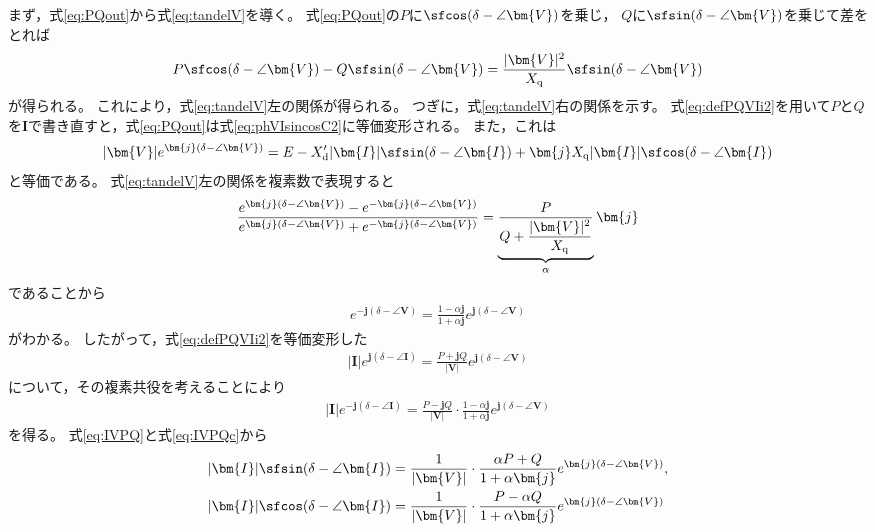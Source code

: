 \documentclass[tombow,dvipdfmx]{corona-a5-1.1}
\begin{document}
\begin{証明}
まず，式\ref{eq:PQout}から式\ref{eq:tandelV}を導く。
式\ref{eq:PQout}の$P$に$\sfcos (\delta - \angle \bm{V})$を乗じ，
$Q$に$\sfsin (\delta - \angle \bm{V})$を乗じて差をとれば
\begin{align*}
P \sfcos (\delta - \angle \bm{V}) - Q \sfsin (\delta - \angle \bm{V})
= \frac{|\bm{V}|^2}{X_{\rm q}} \sfsin (\delta - \angle \bm{V}) 
\end{align*}
が得られる。
これにより，式\ref{eq:tandelV}左の関係が得られる。
つぎに，式\ref{eq:tandelV}右の関係を示す。
式\ref{eq:defPQVIi2}を用いて$P$と$Q$を$\bm{I}$で書き直すと，式\ref{eq:PQout}は式\ref{eq:phVIsincosC2}に等価変形される。
また，これは
\begin{align}\label{eq:tmpVE}
|\bm{V}|e^{\bm{j}(\delta - \angle \bm{V})}=E
-X_{\rm d}' |\bm{I}| \sfsin (\delta - \angle \bm{I})
+ 
\bm{j} X_{\rm q} 
|\bm{I}| \sfcos (\delta - \angle \bm{I})
\end{align}
と等価である。
式\ref{eq:tandelV}左の関係を複素数で表現すると
\begin{align*}
\frac{ e^{\bm{j}(\delta - \angle \bm{V})} - e^{-\bm{j}(\delta - \angle \bm{V})}}
{e^{\bm{j}(\delta - \angle \bm{V})} + e^{-\bm{j}(\delta - \angle \bm{V})}}
= 
\underbrace{
\frac{P}{Q + \frac{ |\bm{V}|^2}{X_{\rm q}} }
}_{\alpha}
 \bm{j}
\end{align*}
であることから
\begin{align*}
e^{-\bm{j}(\delta - \angle \bm{V})} = \frac{1-\alpha \bm{j}}{1+\alpha \bm{j}}
e^{\bm{j}(\delta - \angle \bm{V})}
\end{align*}
がわかる。
したがって，式\ref{eq:defPQVIi2}を等価変形した
\begin{align}\label{eq:IVPQ}
|\bm{I}|e^{\bm{j}(\delta - \angle \bm{I})} = \frac{P+\bm{j}Q}{|\bm{V}|}  
e^{\bm{j}(\delta - \angle \bm{V})}
\end{align}
について，その複素共役を考えることにより
\begin{align}\label{eq:IVPQc}
|\bm{I}|e^{-\bm{j}(\delta - \angle \bm{I})} = \frac{P-\bm{j}Q}{|\bm{V}|}  
\cdot \frac{1-\alpha \bm{j}}{1+\alpha \bm{j}}
e^{\bm{j}(\delta - \angle \bm{V})}
\end{align}
を得る。
式\ref{eq:IVPQ}と式\ref{eq:IVPQc}から
\begin{align*}
|\bm{I}| \sfsin (\delta - \angle \bm{I})
& =
\frac{1}{|\bm{V}|} \cdot
\frac{\alpha P +Q}{ 1+\alpha \bm{j} }e^{\bm{j}(\delta - \angle \bm{V})}, \\
|\bm{I}| \sfcos (\delta - \angle \bm{I})
& =
\frac{1}{|\bm{V}|} \cdot
\frac{ P - \alpha Q}{ 1+\alpha \bm{j} }e^{\bm{j}(\delta - \angle \bm{V})}

\end{align*}
\end{証明}
\end{document}

